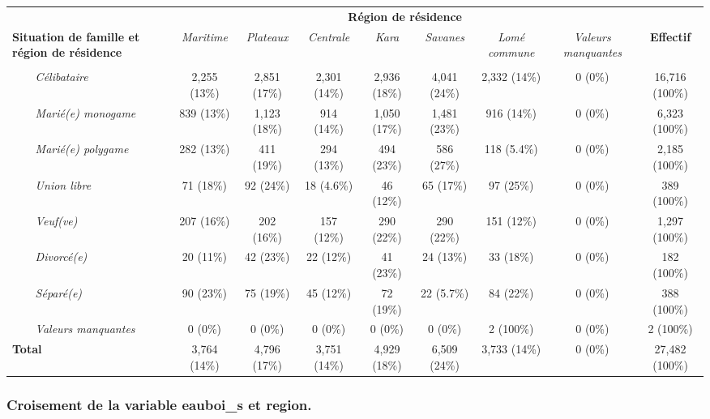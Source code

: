 \documentclass[
]{article}
\begin{document}
\begin{table}[!t]
\fontsize{12.0pt}{14.4pt}\selectfont
\begin{tabular*}{\linewidth}{@{\extracolsep{\fill}}lcccccccc}
\toprule
 & \multicolumn{7}{c}{\textbf{Région de résidence}} &  \\ 
\cmidrule(lr){2-8}
\textbf{Situation de famille et région de résidence} & \emph{Maritime} & \emph{Plateaux} & \emph{Centrale} & \emph{Kara} & \emph{Savanes} & \emph{Lomé commune} & \emph{Valeurs manquantes} & \textbf{Effectif} \\ 
\midrule\addlinespace[2.5pt]
{\bfseries Situation de famille} &  &  &  &  &  &  &  &  \\ 
{\itshape     Célibataire} & 2,255 (13\%) & 2,851 (17\%) & 2,301 (14\%) & 2,936 (18\%) & 4,041 (24\%) & 2,332 (14\%) & 0 (0\%) & 16,716 (100\%) \\ 
{\itshape     Marié(e) monogame} & 839 (13\%) & 1,123 (18\%) & 914 (14\%) & 1,050 (17\%) & 1,481 (23\%) & 916 (14\%) & 0 (0\%) & 6,323 (100\%) \\ 
{\itshape     Marié(e) polygame} & 282 (13\%) & 411 (19\%) & 294 (13\%) & 494 (23\%) & 586 (27\%) & 118 (5.4\%) & 0 (0\%) & 2,185 (100\%) \\ 
{\itshape     Union libre} & 71 (18\%) & 92 (24\%) & 18 (4.6\%) & 46 (12\%) & 65 (17\%) & 97 (25\%) & 0 (0\%) & 389 (100\%) \\ 
{\itshape     Veuf(ve)} & 207 (16\%) & 202 (16\%) & 157 (12\%) & 290 (22\%) & 290 (22\%) & 151 (12\%) & 0 (0\%) & 1,297 (100\%) \\ 
{\itshape     Divorcé(e)} & 20 (11\%) & 42 (23\%) & 22 (12\%) & 41 (23\%) & 24 (13\%) & 33 (18\%) & 0 (0\%) & 182 (100\%) \\ 
{\itshape     Séparé(e)} & 90 (23\%) & 75 (19\%) & 45 (12\%) & 72 (19\%) & 22 (5.7\%) & 84 (22\%) & 0 (0\%) & 388 (100\%) \\ 
{\itshape     Valeurs manquantes} & 0 (0\%) & 0 (0\%) & 0 (0\%) & 0 (0\%) & 0 (0\%) & 2 (100\%) & 0 (0\%) & 2 (100\%) \\ 
{\bfseries Total} & 3,764 (14\%) & 4,796 (17\%) & 3,751 (14\%) & 4,929 (18\%) & 6,509 (24\%) & 3,733 (14\%) & 0 (0\%) & 27,482 (100\%) \\ 
\bottomrule
\end{tabular*}
\end{table}

\subsubsection{Croisement de la variable eauboi\_s et
region.}\label{croisement-de-la-variable-eauboi_s-et-region.}
\end{document}
